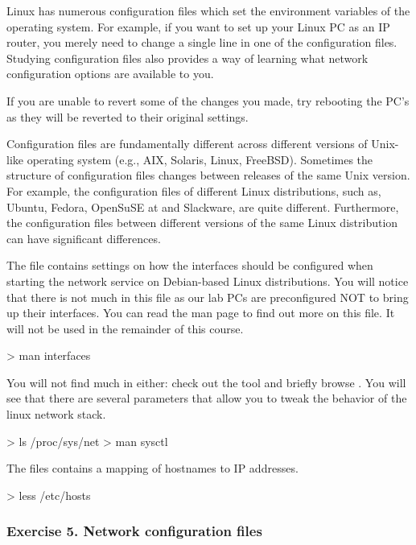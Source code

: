Linux has numerous configuration files which set the environment variables of the operating system. For example, if you want to set up your Linux PC as an IP router, you merely need to change a single line in one of the configuration files. Studying configuration files also provides a way of learning what network configuration options are available to you.

\remark If you are unable to revert some of the changes you made, try rebooting the PC's as they will be reverted to their original settings.

\remark Configuration files are fundamentally different across different versions of Unix-like operating system (e.g., AIX, Solaris, Linux, FreeBSD). Sometimes the structure of configuration files changes between releases of the same Unix version. For example, the configuration files of different Linux distributions, such as, Ubuntu, Fedora, OpenSuSE at and Slackware, are quite different. Furthermore, the configuration files between different versions of the same Linux distribution can have significant differences.

The file  contains settings on how the interfaces should be configured when starting the network service on Debian-based Linux distributions. You will notice that there is not much in this file as our lab PCs are preconfigured NOT to bring up their interfaces. You can read the man page to find out more on this file. It will not be used in the remainder of this course.

\begin{cmdblock}
	> man interfaces
\end{cmdblock}

You will not find much in  either: check out the  tool and briefly browse . You will see that there are several parameters that allow you to tweak the behavior of the linux network stack.

\begin{cmdblock}
	> ls /proc/sys/net
	> man sysctl
\end{cmdblock}

The  files contains a mapping of hostnames to IP addresses.

\begin{cmdblock}
	> less /etc/hosts
\end{cmdblock}

\subsubsection*{Exercise 5. Network configuration files}
\begin{questions}
\end{questions}

